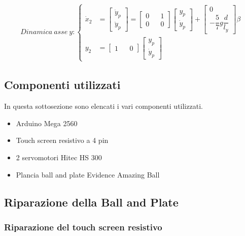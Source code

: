 \begin{align}
	Dinamica\ asse\ y:
	\begin{cases}
		\dot{x}_{2}&=
		\begin{bmatrix}
			\dot{y}_{p} \\ \ddot{y}_{p}
		\end{bmatrix}
		=
		\begin{bmatrix}
			0 && 1 \\ 0 && 0
		\end{bmatrix}
		\begin{bmatrix}
			y_{p}	\\ \dot{y}_{p}
		\end{bmatrix}
		+
		\begin{bmatrix}
			0	\\	-\dfrac{5}{7}g\dfrac{d}{l_{y}}
		\end{bmatrix}
		\beta
		\\
		y_{2}&=
		\begin{bmatrix}
			1 && 0
		\end{bmatrix}
		\begin{bmatrix}
			y_{p} \\ \dot{y}_{p}
		\end{bmatrix}
	\end{cases}
\end{align}

\newpage
\subsection{Componenti utilizzati}

In questa sottosezione sono elencati i vari componenti utilizzati.

\begin{itemize}[noitemsep]
	\item Arduino Mega 2560
	\item Touch screen resistivo a 4 pin
	\item 2 servomotori Hitec HS 300
	\item Plancia ball and plate Evidence Amazing Ball\cite{plancia}
\end{itemize}

\subsection{Riparazione della Ball and Plate}

\subsubsection{Riparazione del touch screen resistivo}

